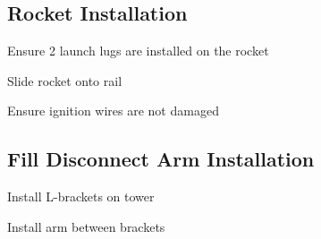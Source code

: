 \subsection{Rocket Installation}
\begin{checklist}
\item Ensure 2 launch lugs are installed on the rocket
\item Slide rocket onto rail
\item Ensure ignition wires are not damaged

\subsection{Fill Disconnect Arm Installation}
\item Install L-brackets on tower
\item Install arm between brackets
\end{checklist}

